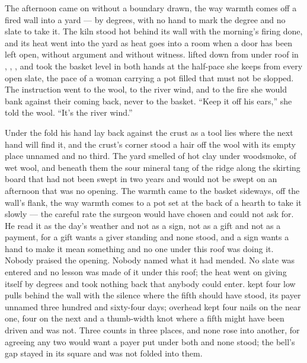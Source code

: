 The afternoon came on without a boundary drawn, the way warmth comes off a fired wall into a yard --- by degrees, with no hand to mark the degree and no slate to take it. The kiln stood hot behind its wall with the morning's firing done, and its heat went into the yard as heat goes into a room when a door has been left open, without argument and without witness.  lifted  down from under  roof in , , , and took the basket level in both hands at the half-pace she keeps from every open slate, the pace of a woman carrying a pot filled that must not be slopped. The instruction went to the wool, to the river wind, and to the fire she would bank against their coming back, never to the basket. “Keep it off his ears,” she told the wool. “It's the river wind.”

Under the fold his hand lay back against the crust as a tool lies where the next hand will find it, and the crust's corner stood a hair off the wool with its empty place unnamed and no third. The yard smelled of hot clay under woodsmoke, of wet wool, and beneath them the sour mineral tang of the ridge along the skirting board that had not been swept in two years and would not be swept on an afternoon that was no opening. The warmth came to the basket sideways, off the wall's flank, the way warmth comes to a pot set at the back of a hearth to take it slowly --- the careful rate the surgeon would have chosen and could not ask for. He read it as the day's weather and not as a sign, not as a gift and not as a payment, for a gift wants a giver standing and none stood, and a sign wants a hand to make it mean something and no one under this roof was doing it. Nobody praised the opening. Nobody named what it had mended. No slate was entered and no lesson was made of it under this roof; the heat went on giving itself by degrees and took nothing back that anybody could enter.  kept four low pulls behind the wall with the silence where the fifth should have stood, its payer unnamed three hundred and sixty-four days; overhead  kept four nails on the near one, four on the next and a thumb-width knot where a fifth might have been driven and was not. Three counts in three places, and none rose into another, for agreeing any two would want a payer put under both and none stood; the bell's gap stayed in its square and was not folded into them.

